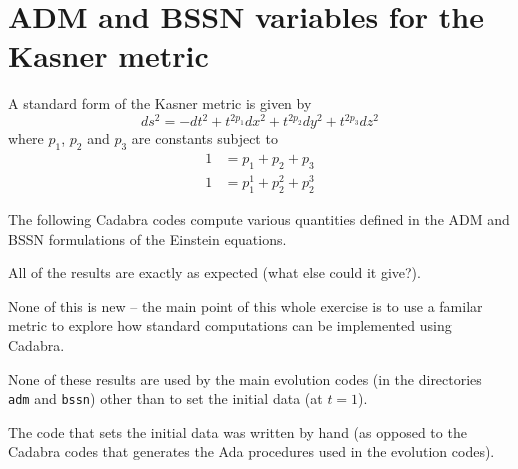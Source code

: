 \documentclass[12pt]{cdblatex}
\begin{document}
\section*{ADM and BSSN variables for the Kasner metric}

A standard form of the Kasner metric is given by
\begin{equation*}
   ds^2 = - dt^2 + t^{2p_1} dx^2 + t^{2p_2} dy^2 + t^{2p_3} dz^2
\end{equation*}
where $p_1$, $p_2$ and $p_3$ are constants subject to
\begin{align*}
   1 &= p_1 + p_2 + p_3\\
   1 &= p^1_1 + p^2_2 + p^3_2
\end{align*}

The following Cadabra codes compute various quantities defined in the ADM and BSSN
formulations of the Einstein equations.

All of the results are exactly as expected (what else could it give?).

None of this is new -- the main point of this whole exercise is to use a familar metric
to explore how standard computations can be implemented using Cadabra.

None of these results are used by the main evolution codes (in the directories {\tt
adm} and {\tt bssn}) other than to set the initial data (at $t=1$).

The code that sets the initial data was written by hand (as opposed to the Cadabra
codes that generates the Ada procedures used in the evolution codes).

\clearpage
\end{document}
